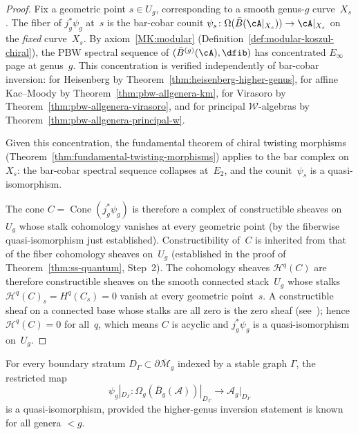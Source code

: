 \begin{proof}
Fix a geometric point $s \in U_g$, corresponding to a smooth
genus-$g$ curve~$X_s$. The fiber of $j_g^*\psi_g$ at~$s$ is
the bar-cobar counit
$\psi_s\colon \Omega(\bar{B}(\cA|_{X_s})) \to \cA|_{X_s}$
on the \emph{fixed} curve~$X_s$.
By axiom~\ref{MK:modular}
(Definition~\ref{def:modular-koszul-chiral}), the PBW spectral
sequence of $(\bar{B}^{(g)}(\cA), \dfib)$ has concentrated
$E_\infty$ page at genus~$g$. This concentration is verified
independently of bar-cobar inversion: for Heisenberg by
Theorem~\ref{thm:heisenberg-higher-genus}, for affine
Kac--Moody by Theorem~\ref{thm:pbw-allgenera-km}, for Virasoro
by Theorem~\ref{thm:pbw-allgenera-virasoro}, and for principal
$\mathcal{W}$-algebras by
Theorem~\ref{thm:pbw-allgenera-principal-w}.

Given this concentration, the fundamental theorem of chiral
twisting morphisms
(Theorem~\ref{thm:fundamental-twisting-morphisms})
applies to the bar complex on~$X_s$: the bar-cobar
spectral sequence collapses at~$E_2$, and the counit~$\psi_s$
is a quasi-isomorphism.

The cone $C = \operatorname{Cone}(j_g^*\psi_g)$ is therefore a complex of
constructible sheaves on~$U_g$ whose stalk cohomology vanishes at every
geometric point (by the fiberwise quasi-isomorphism just established).
Constructibility of~$C$ is inherited from that of the fiber
cohomology sheaves on~$U_g$
(established in the proof of Theorem~\ref{thm:ss-quantum},
Step~2).
The cohomology sheaves $\mathcal{H}^q(C)$ are therefore
constructible sheaves on the smooth connected stack~$U_g$
whose stalks $\mathcal{H}^q(C)_s = H^q(C_s) = 0$ vanish at
every geometric point~$s$.
A constructible sheaf on a connected base whose stalks are all
zero is the zero sheaf
(see~\cite[Expos\'e~IX, Th\'eor\`eme~2.14]{SGA4});
hence $\mathcal{H}^q(C) = 0$ for all~$q$, which means $C$ is
acyclic and $j_g^*\psi_g$ is a quasi-isomorphism on~$U_g$.
\end{proof}

\begin{lemma}\label{lem:higher-genus-boundary-qi}
For every boundary stratum $D_\Gamma \subset \partial\overline{\mathcal{M}}_g$
indexed by a stable graph $\Gamma$, the restricted map
\[\psi_g|_{D_\Gamma}: \Omega_g(\bar{B}_g(\mathcal{A}))|_{D_\Gamma}
\longrightarrow \mathcal{A}_g|_{D_\Gamma}\]
is a quasi-isomorphism, provided the higher-genus inversion statement is known for
all genera $< g$.
\end{lemma}

